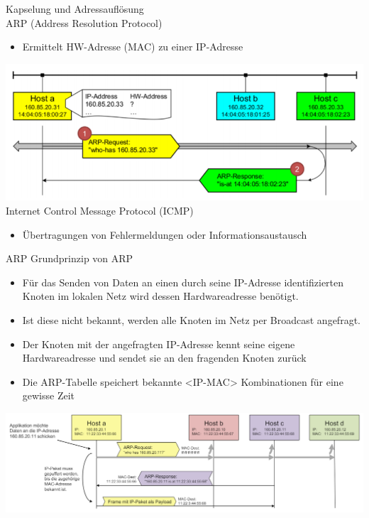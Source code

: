 \begin{KR}{Kapselung und Adressauflösung}\\
    ARP (Address Resolution Protocol)
    \begin{itemize}
        \item Ermittelt HW-Adresse (MAC) zu einer IP-Adresse
    \end{itemize}
        \includegraphics[width=0.75\linewidth]{images/arp.png}\\
    Internet Control Message Protocol (ICMP)
    \begin{itemize}
        \item Übertragungen von Fehlermeldungen oder Informationsaustausch
    \end{itemize}
\end{KR}

\begin{concept}{ARP}
    Grundprinzip von ARP
    \begin{itemize}
        \item Für das Senden von Daten an einen durch seine IP-Adresse identifizierten Knoten im lokalen Netz wird dessen Hardwareadresse benötigt.
        \item Ist diese nicht bekannt, werden alle Knoten im Netz per Broadcast angefragt.
        \item Der Knoten mit der angefragten IP-Adresse kennt seine eigene Hardwareadresse und sendet sie an den fragenden Knoten zurück
        \item Die ARP-Tabelle speichert bekannte <IP-MAC> Kombinationen für eine gewisse Zeit
    \end{itemize}
        \includegraphics[width=1\linewidth]{images/arp_concept.png}
\end{concept}


